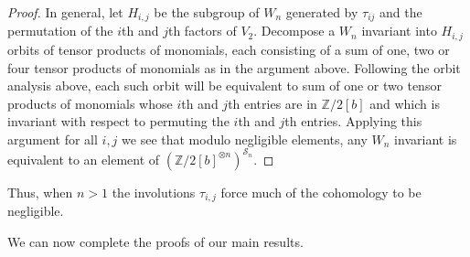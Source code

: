 \documentclass{article}
\theoremstyle{plain}
\theoremstyle{definition}
\newcommand{\Z}{\mathbb{Z}}
\newcommand{\si}{\mathcal{S}}
\newcommand{\alt}{\mathcal{A}}
\begin{document}
\begin{proof}
In general, let $H_{i,j}$ be the subgroup of $W_n$ generated by
$\tau_{ij}$ and the permutation of the $i$th and $j$th
factors of $V_2$.
Decompose a $W_n$ invariant into $H_{i,j}$ orbits of tensor products of monomials,
each consisting of a sum of one, two or four tensor products of monomials as in the argument above.
Following the orbit analysis above, 
each such orbit will be equivalent to sum of one or two 
tensor products of monomials
whose $i$th and $j$th entries are in $\Z/2[b]$ and which
is invariant with respect to permuting the $i$th and $j$th entries.
    Applying this argument
    for all $i, j$ we see that modulo
    negligible elements, any $W_n$ invariant is equivalent to
    an element of $\left(\Z/2[b]^{\otimes n}\right)^{\si_n}$.
\end{proof} 

Thus, when $n>1$ the involutions $\tau_{i,j}$ force much
of the cohomology to be negligible. 

We can now complete the proofs of our main results.\\
\end{document}
